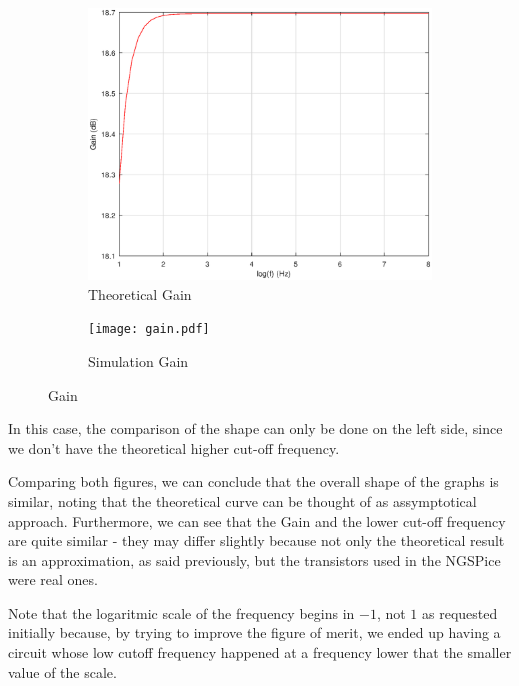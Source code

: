 \begin{figure}[h]
\centering
\begin{subfigure}{.5\textwidth}
    \centering
    \vspace{2.8 cm}
    \includegraphics[scale=0.4]{Gain.eps}
    \caption{Theoretical Gain}
\end{subfigure}%
\begin{subfigure}{.5\textwidth}
    \centering
    \texttt{[image: gain.pdf]}
    \caption{Simulation Gain}
\end{subfigure}
\caption{Gain}
\label{fig:Gain}
\end{figure}

In this case, the comparison of the shape can only be done on the left side, since we don't have the theoretical higher cut-off frequency. 

Comparing both figures, we can conclude that the overall shape of the graphs is similar, noting that the theoretical curve can be thought of as assymptotical approach. Furthermore, we can see that the Gain and the lower cut-off frequency are quite similar - they may differ slightly because not only the theoretical result is an approximation, as said previously, but the transistors used in the NGSPice were real ones.

Note that the logaritmic scale of the frequency begins in $-1$, not $1$ as requested initially because, by trying to improve the figure of merit, we ended up having a circuit whose low cutoff frequency happened at a frequency lower that the smaller value of the scale.


